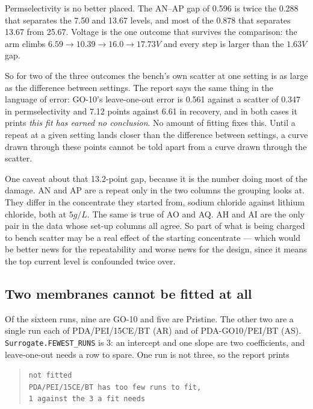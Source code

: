 Permselectivity is no better placed. The AN--AP gap of 0.596 is twice the 0.288 that
separates the 7.50 and 13.67 levels, and most of the 0.878 that separates 13.67 from
25.67. Voltage is the one outcome that survives the comparison: the arm climbs
$6.59 \to 10.39 \to 16.0 \to 17.73\unit{V}$ and every step is larger than the
$1.63\unit{V}$ gap.

So for two of the three outcomes the bench's own scatter at one setting is as large as the
difference between settings. The report says the same thing in the language of error:
GO-10's leave-one-out error is 0.561 against a scatter of 0.347 in permselectivity and
7.12 points against 6.61 in recovery, and in both cases it prints \emph{this fit has
earned no conclusion}. No amount of fitting fixes this. Until a repeat at a given setting
lands closer than the difference between settings, a curve drawn through these points
cannot be told apart from a curve drawn through the scatter.

One caveat about that 13.2-point gap, because it is the number doing most of the damage.
AN and AP are a repeat only in the two columns the grouping looks at. They differ in the
concentrate they started from, sodium chloride against lithium chloride, both at
$5\unit{g/L}$. The same is true of AO and AQ. AH and AI are the only pair in the data
whose set-up columns all agree. So part of what is being charged to bench scatter may be
a real effect of the starting concentrate --- which would be better news for the
repeatability and worse news for the design, since it means the top current level is
confounded twice over.

\subsection{Two membranes cannot be fitted at all}
\label{sec:limits:membranes}

Of the sixteen runs, nine are GO-10 and five are Pristine. The other two are a single
run each of PDA/PEI/15CE/BT (AR) and of PDA-GO10/PEI/BT (AS).
\texttt{Surrogate.FEWEST\_RUNS} is 3: an intercept and one
slope are two coefficients, and leave-one-out needs a row to spare. One run is not three,
so the report prints

\begin{quote}
\texttt{not fitted}\\
\texttt{PDA/PEI/15CE/BT has too few runs to fit,}\\
\texttt{1 against the 3 a fit needs}
\end{quote}

